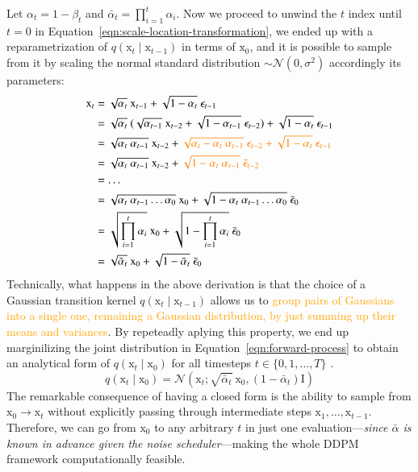 \noindent Let $\alpha_{t}=1 - \beta_{t}$ and $\bar{\alpha}_{t}=\prod_{i=1}^{t}\alpha_{i}$. Now we proceed to unwind the $t$ index until $t=0$ in Equation~\ref{eqn:scale-location-transformation}, we ended up with a reparametrization of $q(\mathrm{x}_{t}\mid\mathrm{x}_{t-1})$ in terms of $\mathrm{x}_{0}$, and it is possible to sample from it by scaling the normal standard distribution $\sim \mathcal{N}(0, \sigma^2)$ accordingly its parameters:
\begin{equation}\label{eqn:reparameterization-trick}
    \begin{split}
            \mathrm{x}_{t} & = \sqrt{\alpha_{t}}~\mathrm{x}_{t-1} + \sqrt{1-\alpha_{t}}~\epsilon_{t-1} \\
             & = \sqrt{\alpha_{t}}~(\sqrt{\alpha_{t-1}}~\mathrm{x}_{t-2} + \sqrt{1 - \alpha_{t-1}}~\epsilon_{t-2}) + \sqrt{1-\alpha_{t}}~\epsilon_{t-1} \\
             &= \sqrt{\alpha_{t}~\alpha_{t-1}}~\mathrm{x}_{t-2} + \textcolor{orange}{\sqrt{\alpha_{t} - \alpha_{t}~\alpha_{t-1}}~\epsilon_{t-2} + \sqrt{1-\alpha_{t}}~\epsilon_{t-1}} \\
             &= \sqrt{\alpha_{t}~\alpha_{t-1}}~\mathrm{x}_{t-2} + \textcolor{orange}{\sqrt{1 - \alpha_{t}~\alpha_{t-1}}~\bar{\epsilon}_{t-2}} \\
             &= \dots \\
             &= \sqrt{\alpha_{t}~\alpha_{t-1}\dots\alpha_{0}}~\mathrm{x}_{0} + \sqrt{1 - \alpha_{t}~\alpha_{t-1}\dots\alpha_{0}}~\bar{\epsilon}_{0} \\
             &= \sqrt{\prod_{i=1}^{t}\alpha_{i}}~\mathrm{x}_{0} + \sqrt{1 - \prod_{i=1}^{t}\alpha_{i}}~\bar{\epsilon}_{0} \\
             &= \sqrt{\bar{\alpha}_{t}}~\mathrm{x}_{0} + \sqrt{1 - \bar{\alpha}_
             {t}}~\bar{\epsilon}_{0} 
    \end{split}
\end{equation}
Technically, what happens in the above derivation is that the choice of a Gaussian transition kernel $q(\mathrm{x}_{t}\mid\mathrm{x}_{t-1})$ allows us to
\textcolor{orange}{group pairs of Gaussians into a single one, remaining a Gaussian distribution, by just summing up their means and variances}.  By repeteadly aplying this property, we end up marginilizing the joint distribution in Equation~\ref{eqn:forward-process} to obtain an analytical form of $q(\mathrm{x}_{t}\mid \mathrm{x}_{0})$ for all timesteps $t\in\{0, 1, \dots, T\}$ . 
\begin{equation}\label{eqn:marginilize_q_xt_on_x0}
    q(\mathrm{x}_{t}\mid \mathrm{x}_{0}) = \mathcal{N}(\mathrm{x}_{t};\sqrt{\bar{\alpha}_{t}}~\mathrm{x}_{0}, (1-\bar{\alpha}_{t})\mathrm{I})
\end{equation}
The remarkable consequence of having a closed form is the ability to sample from $\mathrm{x}_{0}\rightarrow \mathrm{x}_{t}$ without explicitly passing through intermediate steps $\mathrm{x}_{1}, \dots, \mathrm{x}_{t-1}$. Therefore, we can go from $\mathrm{x}_{0}$ to any arbitrary $t$ in just one evaluation---\textit{since $\bar{\alpha}$ is known in advance given the noise scheduler}---making the whole DDPM framework computationally feasible.

